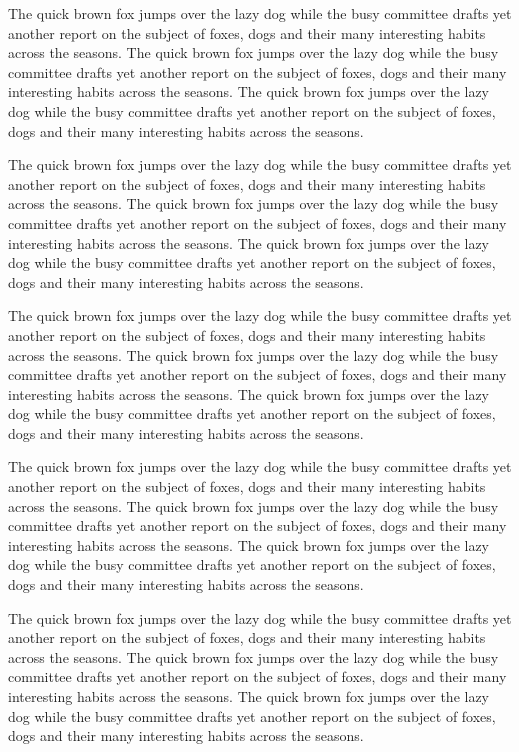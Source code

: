 \documentclass{article}
\begin{document}
The quick brown fox jumps over the lazy dog while the busy committee drafts yet another report on the subject of foxes, dogs and their many interesting habits across the seasons. The quick brown fox jumps over the lazy dog while the busy committee drafts yet another report on the subject of foxes, dogs and their many interesting habits across the seasons. The quick brown fox jumps over the lazy dog while the busy committee drafts yet another report on the subject of foxes, dogs and their many interesting habits across the seasons. 

The quick brown fox jumps over the lazy dog while the busy committee drafts yet another report on the subject of foxes, dogs and their many interesting habits across the seasons. The quick brown fox jumps over the lazy dog while the busy committee drafts yet another report on the subject of foxes, dogs and their many interesting habits across the seasons. The quick brown fox jumps over the lazy dog while the busy committee drafts yet another report on the subject of foxes, dogs and their many interesting habits across the seasons. 

The quick brown fox jumps over the lazy dog while the busy committee drafts yet another report on the subject of foxes, dogs and their many interesting habits across the seasons. The quick brown fox jumps over the lazy dog while the busy committee drafts yet another report on the subject of foxes, dogs and their many interesting habits across the seasons. The quick brown fox jumps over the lazy dog while the busy committee drafts yet another report on the subject of foxes, dogs and their many interesting habits across the seasons. 

The quick brown fox jumps over the lazy dog while the busy committee drafts yet another report on the subject of foxes, dogs and their many interesting habits across the seasons. The quick brown fox jumps over the lazy dog while the busy committee drafts yet another report on the subject of foxes, dogs and their many interesting habits across the seasons. The quick brown fox jumps over the lazy dog while the busy committee drafts yet another report on the subject of foxes, dogs and their many interesting habits across the seasons. 

The quick brown fox jumps over the lazy dog while the busy committee drafts yet another report on the subject of foxes, dogs and their many interesting habits across the seasons. The quick brown fox jumps over the lazy dog while the busy committee drafts yet another report on the subject of foxes, dogs and their many interesting habits across the seasons. The quick brown fox jumps over the lazy dog while the busy committee drafts yet another report on the subject of foxes, dogs and their many interesting habits across the seasons. 
\end{document}
